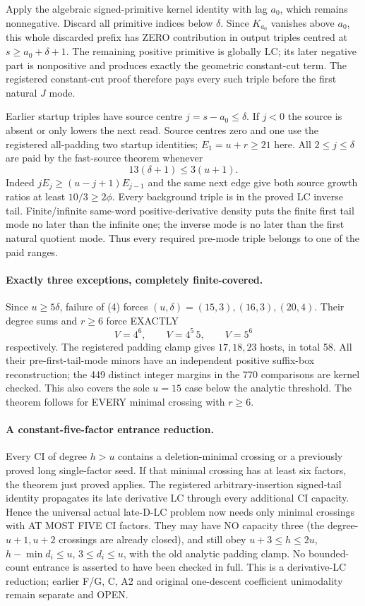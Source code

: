 Apply the algebraic signed-primitive kernel identity with lag
$a_0$, which remains nonnegative. Discard all primitive indices
below $\delta$. Since $K_{a_0}$ vanishes above $a_0$, this
whole discarded prefix has ZERO contribution in output triples
centred at $s\ge a_0+\delta+1$.
The remaining positive primitive is globally LC; its later
negative part is nonpositive and produces exactly the geometric
constant-cut term. The registered constant-cut proof therefore
pays every such triple before the first natural $J$ mode.

Earlier startup triples have source centre $j=s-a_0\le\delta$.
If $j<0$ the source is absent or only lowers the next read.
Source centres zero and one use the registered all-padding
two startup identities; $E_1=u+r\ge21$ here.
All $2\le j\le\delta$ are paid by the fast-source theorem
whenever
\[
                    13(\delta+1)\le3(u+1).         \tag{4}
\]
Indeed $jE_j\ge(u-j+1)E_{j-1}$ and the same next edge give
both source growth ratios at least $10/3\ge2\phi$.
Every background triple is in the proved LC inverse tail.
Finite/infinite same-word positive-derivative density puts the
finite first tail mode no later than the infinite one; the inverse
mode is no later than the first natural quotient mode. Thus every
required pre-mode triple belongs to one of the paid ranges.

\paragraph{Exactly three exceptions, completely finite-covered.}
Since $u\ge5\delta$, failure of (4) forces
$(u,\delta)=(15,3),(16,3),(20,4)$. Their degree sums and
$r\ge6$ force EXACTLY
\[
             V=4^6,\qquad V=4^5\,5,\qquad V=5^6
\]
respectively. The registered padding clamp gives $17,18,23$
hosts, in total 58. All their pre-first-tail-mode minors have
an independent positive suffix-box reconstruction; the 449 distinct
integer margins in the 770 comparisons are kernel checked.
This also covers the sole $u=15$ case below the analytic threshold.
The theorem follows for EVERY minimal crossing with $r\ge6$.

\paragraph{A constant-five-factor entrance reduction.}
Every CI of degree $h>u$ contains a deletion-minimal crossing or
a previously proved long single-factor seed. If that minimal
crossing has at least six factors, the theorem just proved applies.
The registered arbitrary-insertion signed-tail identity propagates
its late derivative LC through every additional CI capacity.
Hence the universal actual late-D-LC problem now needs only
minimal crossings with AT MOST FIVE CI factors. They may have
NO capacity three (the degree-$u+1,u+2$ crossings are already closed),
and still obey $u+3\le h\le2u$, $h-\min d_i\le u$,
$3\le d_i\le u$, with the old analytic padding clamp.
No bounded-count entrance is asserted to have been checked in full.
This is a derivative-LC reduction; earlier F/G, C, A2 and original
one-descent coefficient unimodality remain separate and OPEN.

